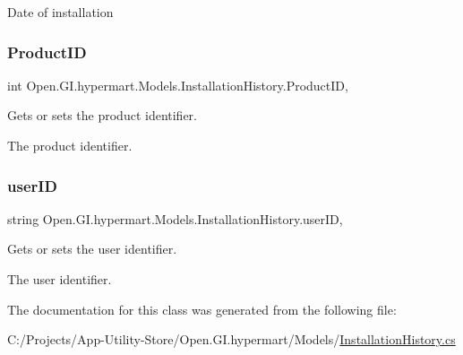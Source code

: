 Date of installation 

\hypertarget{class_open_1_1_g_i_1_1hypermart_1_1_models_1_1_installation_history_a42a9e298540659d4ef03d7bf2440fdae}{}\label{class_open_1_1_g_i_1_1hypermart_1_1_models_1_1_installation_history_a42a9e298540659d4ef03d7bf2440fdae} 
\subsubsection{\texorpdfstring{Product\+ID}{ProductID}}
{\footnotesize\ttfamily int Open.\+G\+I.\+hypermart.\+Models.\+Installation\+History.\+Product\+ID\hspace{0.3cm}{\ttfamily [get]}, {\ttfamily [set]}}



Gets or sets the product identifier. 

The product identifier. \hypertarget{class_open_1_1_g_i_1_1hypermart_1_1_models_1_1_installation_history_acfc4d740fbdade68a23eb93a577c9539}{}\label{class_open_1_1_g_i_1_1hypermart_1_1_models_1_1_installation_history_acfc4d740fbdade68a23eb93a577c9539} 
\subsubsection{\texorpdfstring{user\+ID}{userID}}
{\footnotesize\ttfamily string Open.\+G\+I.\+hypermart.\+Models.\+Installation\+History.\+user\+ID\hspace{0.3cm}{\ttfamily [get]}, {\ttfamily [set]}}



Gets or sets the user identifier. 

The user identifier. 

The documentation for this class was generated from the following file\+:\begin{DoxyCompactItemize}
\item 
C\+:/\+Projects/\+App-\/\+Utility-\/\+Store/\+Open.\+G\+I.\+hypermart/\+Models/\hyperlink{_installation_history_8cs}{Installation\+History.\+cs}\end{DoxyCompactItemize}
